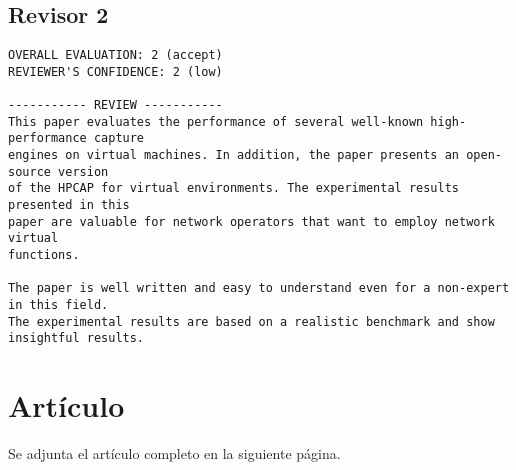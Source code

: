 \subsection{Revisor 2}
\begin{verbatim}
OVERALL EVALUATION: 2 (accept)
REVIEWER'S CONFIDENCE: 2 (low)

----------- REVIEW -----------
This paper evaluates the performance of several well-known high-performance capture
engines on virtual machines. In addition, the paper presents an open-source version
of the HPCAP for virtual environments. The experimental results presented in this
paper are valuable for network operators that want to employ network virtual
functions.

The paper is well written and easy to understand even for a non-expert in this field.
The experimental results are based on a realistic benchmark and show insightful results.
\end{verbatim}

\section{Artículo}
Se adjunta el artículo completo en la siguiente página.

